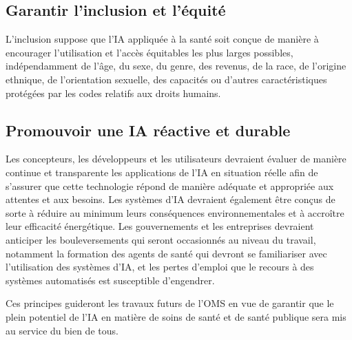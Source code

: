 \subsection{Garantir l'inclusion et l'équité}
L'inclusion suppose que l'IA appliquée à la santé soit conçue de manière à
encourager l'utilisation et l'accès équitables les plus larges possibles,
indépendamment de l'âge, du sexe, du genre, des revenus, de la race, de
l'origine ethnique, de l'orientation sexuelle, des capacités ou d'autres
caractéristiques protégées par les codes relatifs aux droits humains.

\subsection{Promouvoir une IA réactive et durable}
Les concepteurs, les développeurs et les utilisateurs devraient évaluer de
manière continue et transparente les applications de l'IA en situation réelle
afin de s'assurer que cette technologie répond de manière adéquate et
appropriée aux attentes et aux besoins. Les systèmes d'IA devraient également
être conçus de sorte à réduire au minimum leurs conséquences environnementales
et à accroître leur efficacité énergétique. Les gouvernements et les
entreprises devraient anticiper les bouleversements qui seront occasionnés au
niveau du travail, notamment la formation des agents de santé qui devront se
familiariser avec l'utilisation des systèmes d'IA, et les pertes d'emploi que
le recours à des systèmes automatisés est susceptible d'engendrer.

\bigskip
Ces principes guideront les travaux futurs de l'OMS en vue de garantir que le
plein potentiel de l'IA en matière de soins de santé et de santé publique sera
mis au service du bien de tous.

